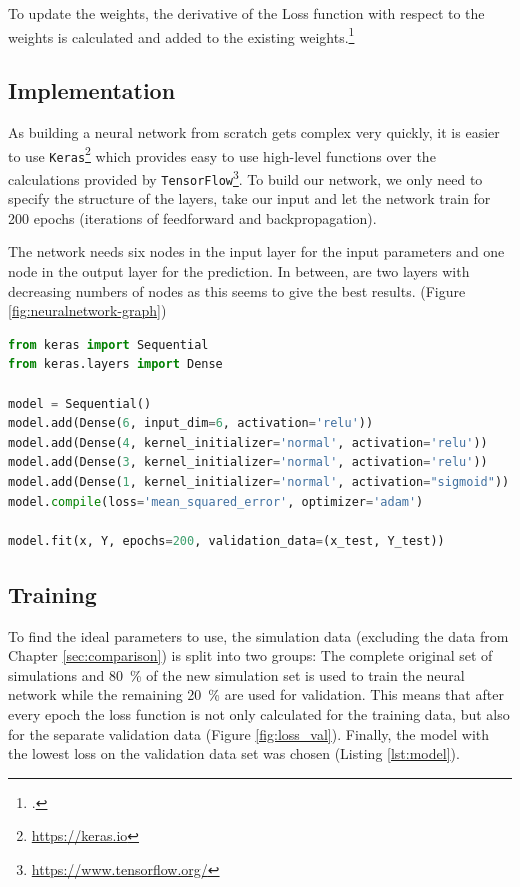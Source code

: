 To update the weights, the derivative of the Loss function with respect to the weights is calculated and added to the existing weights.\footcite{NN-python}

\subsection{Implementation}

As building a neural network from scratch gets complex very quickly, it is easier to use \texttt{Keras}\footnote{\url{https://keras.io}} which provides easy to use high-level functions over the calculations provided by \texttt{TensorFlow}\footnote{\url{https://www.tensorflow.org/}}. To build our network, we only need to specify the structure of the layers, take our input and let the network train for 200 epochs (iterations of feedforward and backpropagation). 

The network needs six nodes in the input layer for the input parameters and one node in the output layer for the prediction. In between, are two layers with decreasing numbers of nodes as this seems to give the best results. (Figure \ref{fig:neuralnetwork-graph})

\begin{lstlisting}[language=Python,caption=The used model as Keras code,label=lst:model]
from keras import Sequential
from keras.layers import Dense

model = Sequential()
model.add(Dense(6, input_dim=6, activation='relu'))
model.add(Dense(4, kernel_initializer='normal', activation='relu'))
model.add(Dense(3, kernel_initializer='normal', activation='relu'))
model.add(Dense(1, kernel_initializer='normal', activation="sigmoid"))
model.compile(loss='mean_squared_error', optimizer='adam')

model.fit(x, Y, epochs=200, validation_data=(x_test, Y_test))

\end{lstlisting}

\subsection{Training}

To find the ideal parameters to use, the simulation data (excluding the data from Chapter \ref{sec:comparison}) is split into two groups: The complete original set of simulations and \SI{80}{\percent} of the new simulation set is used to train the neural network while the remaining \SI{20}{\percent} are used for validation. This means that after every epoch the loss function is not only calculated for the training data, but also for the separate validation data (Figure \ref{fig:loss_val}). Finally, the model with the lowest loss on the validation data set was chosen (Listing \ref{lst:model}).


